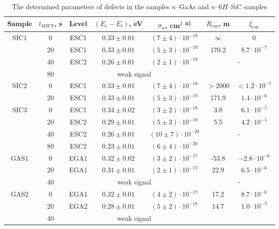 \documentclass[final,3p,times,twocolumn,authoryear]{elsarticle}
\begin{document}
\begin{table}
\caption{\label{tabMW}The determined parameters of defects in the samples $n$--GaAs and $n$--6$H$--SiC samples
}
\center
\begin{tabular}{ccccccc}
\hline
Sample& $t_\mathrm{MWT}$, s &Level &$(E_c-E_t)$, eV &$\sigma_n$, cm$^2$\textsuperscript{ a)}&$R_\mathrm{cur}$, m&$\xi_\mathrm{cur}$\\
\hline
SIC1& 0 &ESC1& $0.33\pm0.01$ &$(7\pm4)\cdot10^{-18}$&$\infty$&0\\ %
& 20 &ESC1& $0.33\pm0.01$ &$(5\pm3)\cdot10^{-19}$&170.2&$8.7\cdot10^{-7}$\\ %
& 40 &ESC2& $0.26\pm0.01$ &$(2\pm1)\cdot10^{-19}$&\multicolumn{2}{c}{\multirow{2}{*}{-}}\\ %
& 80 & \multicolumn{3}{c}{weak signal}&\multicolumn{2}{c}{}\\ %
SIC2& 0 &ESC1& $0.33\pm0.01$ &$(7\pm4)\cdot10^{-18}$&$>2000$&$<1.2\cdot10^{-7}$\\ %
& 20 &ESC1& $0.33\pm0.01$ &$(5\pm3)\cdot10^{-19}$&171.9&$1.4\cdot10^{-6}$\\ %
SIC3& 0 &ESC1& $0.34\pm0.02$ &$(3\pm2)\cdot10^{-18}$&3.8&$6.1\cdot10^{-5}$\\ %
& 20 &ESC2&$0.29\pm0.01$ &$(5\pm3)\cdot10^{-19}$&5.5&$4.2\cdot10^{-5}$\\ %
& 40 &ESC2& $0.26\pm0.01$ &$(10\pm7)\cdot10^{-20}$&\multicolumn{2}{c}{\multirow{2}{*}{-}}\\ %
& 80 &ESC2& $0.23\pm0.01$ &$(6\pm4)\cdot10^{-20}$&\multicolumn{2}{c}{}\\ %
GAS1& 0 &EGA1& $0.32\pm0.02$ &$(3\pm2)\cdot10^{-17}$&-53.8&$-2.8\cdot10^{-6}$\\ %
& 20 &EGA1& $0.31\pm0.01$ &$(2\pm1)\cdot10^{-17}$&22.9&$6.5\cdot10^{-6}$\\ %
& 40 & \multicolumn{3}{c}{weak signal}&\multicolumn{2}{c}{-}\\ %
GAS2& 0 &EGA1& $0.32\pm0.01$ &$(4\pm2)\cdot10^{-17}$&17.2&$8.7\cdot10^{-6}$\\ %
& 20 &EGA2& $0.28\pm0.01$ &$(5\pm2)\cdot10^{-18}$&14.7&$1.0\cdot10^{-5}$\\ %
& 40 & \multicolumn{3}{c}{weak signal}&\multicolumn{2}{c}{}\\ %

\end{tabular}
\end{table}
\end{document}
